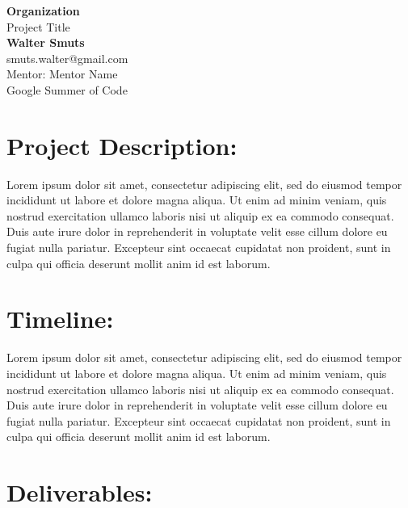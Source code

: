 \documentclass{article}
\begin{document}
\begin{center}

\LARGE{\textbf{Organization}} \\
\vspace{1em}
\Large{Project Title} \\
\vspace{1em}
\normalsize\textbf{Walter Smuts} \\
\normalsize{smuts.walter@gmail.com} \\
\vspace{1em}
\normalsize{Mentor: Mentor Name} \\
\vspace{1em}
\normalsize{Google Summer of Code} \\

\end{center}
\begin{normalsize}

\section{Project Description:}

Lorem ipsum dolor sit amet, consectetur adipiscing elit, sed do eiusmod tempor
incididunt ut labore et dolore magna aliqua. Ut enim ad minim veniam, quis nostrud
exercitation ullamco laboris nisi ut aliquip ex ea commodo consequat. Duis aute
irure dolor in reprehenderit in voluptate velit esse cillum dolore eu fugiat nulla
pariatur. Excepteur sint occaecat cupidatat non proident, sunt in culpa qui
officia deserunt mollit anim id est laborum.

\section{Timeline:}

Lorem ipsum dolor sit amet, consectetur adipiscing elit, sed do eiusmod tempor
incididunt ut labore et dolore magna aliqua. Ut enim ad minim veniam, quis nostrud
exercitation ullamco laboris nisi ut aliquip ex ea commodo consequat. Duis aute
irure dolor in reprehenderit in voluptate velit esse cillum dolore eu fugiat nulla
pariatur. Excepteur sint occaecat cupidatat non proident, sunt in culpa qui
officia deserunt mollit anim id est laborum.

\section{Deliverables:}


\end{normalsize}
\end{document}
